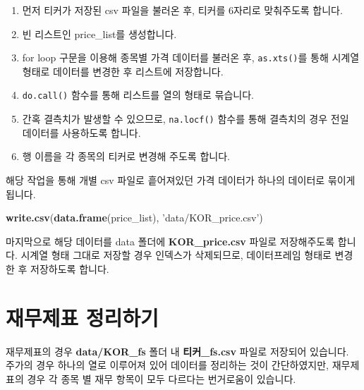 \documentclass[12pt,]{book}
\newenvironment{Shaded}{\begin{snugshade}}{\end{snugshade}}
\newcommand{\KeywordTok}[1]{\textcolor[rgb]{0.13,0.29,0.53}{\textbf{#1}}}
\newcommand{\NormalTok}[1]{#1}
\newcommand{\StringTok}[1]{\textcolor[rgb]{0.31,0.60,0.02}{#1}}
\providecommand{\tightlist}{%
  \setlength{\itemsep}{0pt}\setlength{\parskip}{0pt}}
\begin{document}
\begin{enumerate}
\def\labelenumi{\arabic{enumi}.}
\tightlist
\item
  먼저 티커가 저장된 csv 파일을 불러온 후, 티커를 6자리로 맞춰주도록 합니다.
\item
  빈 리스트인 price\_list를 생성합니다.
\item
  for loop 구문을 이용해 종목별 가격 데이터를 불러온 후, \texttt{as.xts()}를 통해 시계열 형태로 데이터를 변경한 후 리스트에 저장합니다.
\item
  \texttt{do.call()} 함수를 통해 리스트를 열의 형태로 묶습니다.
\item
  간혹 결측치가 발생할 수 있으므로, \texttt{na.locf()} 함수를 통해 결측치의 경우 전일 데이터를 사용하도록 합니다.
\item
  행 이름을 각 종목의 티커로 변경해 주도록 합니다.
\end{enumerate}

해당 작업을 통해 개별 csv 파일로 흩어져있던 가격 데이터가 하나의 데이터로 묶이게 됩니다.

\begin{Shaded}
\begin{Highlighting}[]
\KeywordTok{write.csv}\NormalTok{(}\KeywordTok{data.frame}\NormalTok{(price_list), }\StringTok{'data/KOR_price.csv'}\NormalTok{)}
\end{Highlighting}
\end{Shaded}

마지막으로 해당 데이터를 data 폴더에 \textbf{KOR\_price.csv} 파일로 저장해주도록 합니다. 시계열 형태 그대로 저장할 경우 인덱스가 삭제되므로, 데이터프레임 형태로 변경한 후 저장하도록 합니다.

\hypertarget{section-36}{%
\section{재무제표 정리하기}\label{section-36}}

재무제표의 경우 \textbf{data/KOR\_fs} 폴더 내 \textbf{티커\_fs.csv} 파일로 저장되어 있습니다. 주가의 경우 하나의 열로 이루어져 있어 데이터를 정리하는 것이 간단하였지만, 재무제표의 경우 각 종목 별 재무 항목이 모두 다르다는 번거로움이 있습니다.
\end{document}
